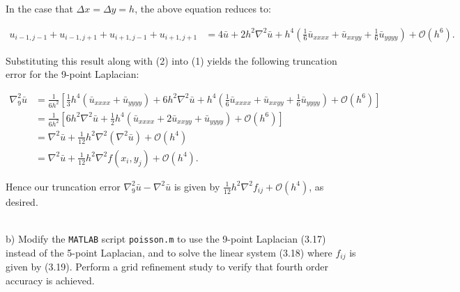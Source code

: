 \begin{solution}
   In the case that $\Delta x = \Delta y = h$, the above equation reduces to:

   \begin{align*}
      u_{i-1, j-1} + u_{i-1, j+1} + u_{i+1, j-1} + u_{i+1, j+1} &= 4 \bar{u} + 2 h^2 \nabla^2 \bar{u}
                                                                   + h^4 \left(\frac{1}{6}\bar{u}_{xxxx} + \bar{u}_{xxyy} +  \frac{1}{6}\bar{u}_{yyyy}\right) + \mathcal{O}(h^6).
   \end{align*}

   \pagebreak
   Substituting this result along with (2) into (1) yields the following truncation error for the 9-point Laplacian:

   \begin{align*}
      \nabla_9^2 \bar{u} &= \frac{1}{6h^2} \left[
                           \frac{1}{3} h^4 (\bar{u}_{xxxx} + \bar{u}_{yyyy}) + 6 h^2 \nabla^2 \bar{u}
                              + h^4 \left(\frac{1}{6}\bar{u}_{xxxx} + \bar{u}_{xxyy} + \frac{1}{6}\bar{u}_{yyyy}\right) + \mathcal{O}(h^6)
                           \right] \\
                         &= \frac{1}{6h^2} \left[
                              6 h^2 \nabla^2 \bar{u} 
                              + \frac{1}{2} h^4 \left(\bar{u}_{xxxx} + 2 \bar{u}_{xxyy} + \bar{u}_{yyyy}\right) 
                              + \mathcal{O}(h^6)
                           \right] \\
                         &= \nabla^2 \bar{u} + \frac{1}{12} h^2 \nabla^2(\nabla^2 \bar{u}) + \mathcal{O}(h^4) \\
                         &= \nabla^2 \bar{u} + \frac{1}{12} h^2 \nabla^2 f(x_i, y_j) + \mathcal{O}(h^4).
   \end{align*}

   Hence our truncation error $\nabla_9^2 \bar{u} - \nabla^2 \bar{u}$ is given by 
   $\frac{1}{12} h^2 \nabla^2 f_{ij} + \mathcal{O}(h^4)$, as desired.
   \ \\\\
\end{solution}

\pagebreak
b) Modify the \texttt{MATLAB} script \texttt{poisson.m} to use the 9-point Laplacian (3.17) instead of the 5-point
   Laplacian, and to solve the linear system (3.18) where $f_{ij}$ is given by (3.19). Perform a grid refinement study
   to verify that fourth order accuracy is achieved.

\begin{solution}\ \\\\
\end{solution}